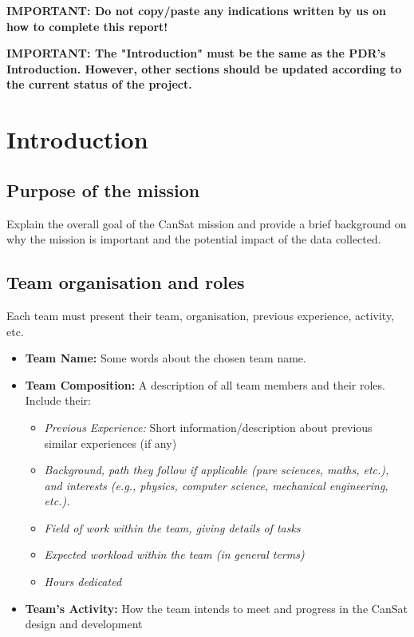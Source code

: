 \documentclass[11pt]{article}
\begin{document}
{\color{red}\textbf{IMPORTANT: Do not copy/paste any indications written by us on how to complete this report!}}

\vspace{1cm}
{\color{red}\textbf{IMPORTANT: The "Introduction" must be the same as the PDR's Introduction. However, other sections should be updated according to the current status of the project.}}
\section{Introduction}

\subsection{Purpose of the mission}
Explain the overall goal of the CanSat mission and provide a brief background on why the mission is important and the potential impact of the data collected.

\subsection{Team organisation and roles}
Each team must present their team, organisation, previous experience, activity, etc.
\begin{itemize}
    \itemsep 0em
    \item {\bf Team Name:} Some words about the chosen team name.
    \item {\bf Team Composition:} A description of all team members and their roles. Include their:
    \setlength{\itemsep}{0em}
    \begin{itemize}
      \itemsep 0em
      \item {\em Previous Experience:} Short information/description about previous similar experiences (if any)
      \item {\em Background, path they follow if applicable (pure sciences, maths, etc.), and interests (e.g., physics, computer science, mechanical engineering, etc.).}
      \item {\em Field of work within the team, giving details of tasks}
      \item {\em Expected workload within the team (in general terms)}
      \item {\em Hours dedicated}
    \end{itemize}
    \item {\bf Team's Activity:} How the team intends to meet and progress in the CanSat design and development
\end{itemize}
\end{document}
